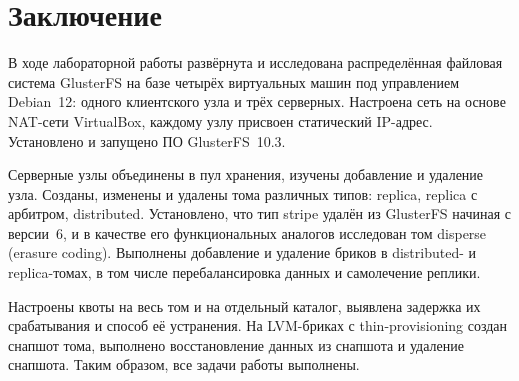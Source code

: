 \newpage
\section{Заключение}

В ходе лабораторной работы развёрнута и исследована распределённая файловая система GlusterFS на базе четырёх виртуальных машин под управлением Debian~12: одного клиентского узла и трёх серверных. Настроена сеть на основе NAT-сети VirtualBox, каждому узлу присвоен статический IP-адрес. Установлено и запущено ПО GlusterFS~10.3.

Серверные узлы объединены в пул хранения, изучены добавление и удаление узла. Созданы, изменены и удалены тома различных типов: replica, replica с арбитром, distributed. Установлено, что тип stripe удалён из GlusterFS начиная с версии~6, и в качестве его функциональных аналогов исследован том disperse (erasure coding). Выполнены добавление и удаление бриков в distributed- и replica-томах, в том числе перебалансировка данных и самолечение реплики.

Настроены квоты на весь том и на отдельный каталог, выявлена задержка их срабатывания и способ её устранения. На LVM-бриках с thin-provisioning создан снапшот тома, выполнено восстановление данных из снапшота и удаление снапшота. Таким образом, все задачи работы выполнены.
